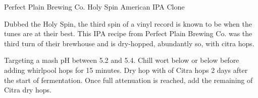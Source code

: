 \begin{recipie}{Perfect Plain Brewing Co. Holy Spin American IPA Clone}

\begin{aboutblock}
Dubbed the Holy Spin, the third spin of a vinyl record is known to be when the
tunes are at their best. This IPA recipe from Perfect Plain Brewing Co. was the
third turn of their brewhouse and is dry-hopped, abundantly so, with citra hops.
\sourceaha
\end{aboutblock}


\begin{methodandtiming}
 
\begin{mashsteps}
\end{mashsteps}

\begin{directions}
Targeting a mash pH between 5.2 and 5.4. Chill wort below  or below
before adding whirlpool hops for 15 minutes. Dry hop with  of Citra
hops 2 days after the start of fermentation. Once full attenuation
is reached, add the remaining  of Citra dry hops.
\end{directions}

\end{methodandtiming}

\pagebreak

\begin{ingredientsblock}

\begin{malts}
\end{malts}

\begin{hops}
\end{hops}


\end{ingredientsblock}

\end{recipie}

